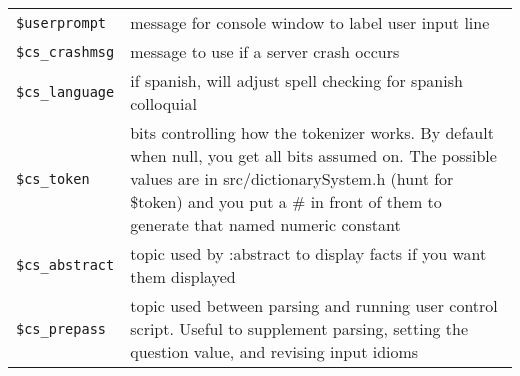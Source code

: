 \documentclass[]{article}
\begin{document}
\begin{longtable}[]{@{}ll@{}}
\begin{minipage}[t]{0.26\columnwidth}
\texttt{\$userprompt}\strut
\end{minipage} & \begin{minipage}[t]{0.10\columnwidth}\raggedright\strut
message for console window to label user input line\strut
\end{minipage}\tabularnewline
\begin{minipage}[t]{0.26\columnwidth}\raggedright\strut
\texttt{\$cs\_crashmsg}\strut
\end{minipage} & \begin{minipage}[t]{0.10\columnwidth}\raggedright\strut
message to use if a server crash occurs\strut
\end{minipage}\tabularnewline
\begin{minipage}[t]{0.26\columnwidth}\raggedright\strut
\texttt{\$cs\_language}\strut
\end{minipage} & \begin{minipage}[t]{0.10\columnwidth}\raggedright\strut
if spanish, will adjust spell checking for spanish colloquial\strut
\end{minipage}\tabularnewline
\begin{minipage}[t]{0.26\columnwidth}\raggedright\strut
\texttt{\$cs\_token}\strut
\end{minipage} & \begin{minipage}[t]{0.10\columnwidth}\raggedright\strut
bits controlling how the tokenizer works. By default when null, you get
all bits assumed on. The possible values are in src/dictionarySystem.h
(hunt for \$token) and you put a \# in front of them to generate that
named numeric constant\strut
\end{minipage}\tabularnewline
\begin{minipage}[t]{0.26\columnwidth}\raggedright\strut
\texttt{\$cs\_abstract}\strut
\end{minipage} & \begin{minipage}[t]{0.10\columnwidth}\raggedright\strut
topic used by :abstract to display facts if you want them
displayed\strut
\end{minipage}\tabularnewline
\begin{minipage}[t]{0.26\columnwidth}\raggedright\strut
\texttt{\$cs\_prepass}\strut
\end{minipage} & \begin{minipage}[t]{0.10\columnwidth}\raggedright\strut
topic used between parsing and running user control script. Useful to
supplement parsing, setting the question value, and revising input
idioms\strut
\end{minipage}\tabularnewline

\end{longtable}
\end{document}
